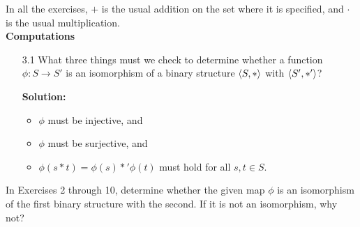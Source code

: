 \noindent In all the exercises, $+$ is the usual addition on the set where it is
          specified, and $\cdot$ is the usual multiplication. \\

\noindent \textbf{Computations}
\begin{enumerate}
   \item[3.1] What three things must we check to determine whether a function
   $\phi : S \rightarrow S'$ is an isomorphism of a binary structure
   $\langle S, * \rangle$ with $\langle S', *' \rangle$?

      \textbf{Solution:}

      \begin{itemize}
         \item $\phi$ must be injective, and
         \item $\phi$ must be surjective, and
         \item $\phi(s * t) = \phi(s) *' \phi(t)$ must hold for all
               $s, t \in S$.
      \end{itemize}
\end{enumerate}

\noindent In Exercises 2 through 10, determine whether the given map $\phi$ is
          an isomorphism of the first binary structure with the second. If it is
          not an isomorphism, why not?

